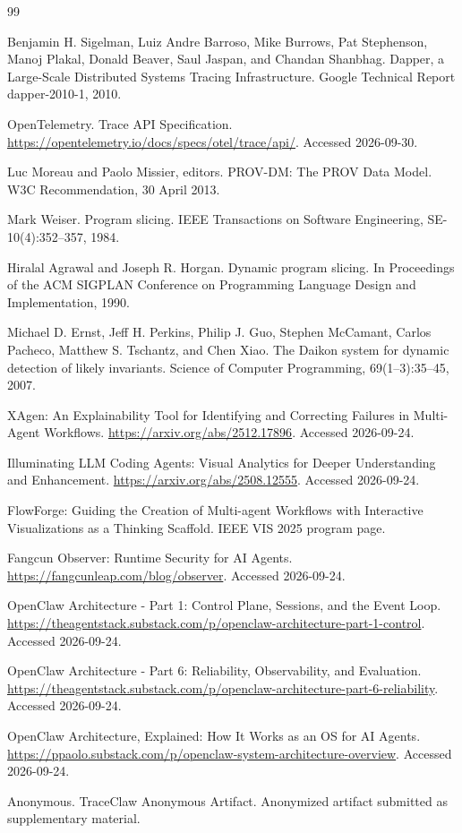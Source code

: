 \documentclass[11pt,a4paper]{article}
\begin{document}
\begin{thebibliography}{99}

Benjamin H. Sigelman, Luiz Andre Barroso, Mike Burrows, Pat Stephenson,
Manoj Plakal, Donald Beaver, Saul Jaspan, and Chandan Shanbhag. Dapper,
a Large-Scale Distributed Systems Tracing Infrastructure. Google
Technical Report dapper-2010-1, 2010.

OpenTelemetry. Trace API Specification.
\url{https://opentelemetry.io/docs/specs/otel/trace/api/}. Accessed 2026-09-30.

Luc Moreau and Paolo Missier, editors. PROV-DM: The PROV Data Model. W3C
Recommendation, 30 April 2013.

Mark Weiser. Program slicing. IEEE Transactions on Software Engineering,
SE-10(4):352--357, 1984.

Hiralal Agrawal and Joseph R. Horgan. Dynamic program slicing. In
Proceedings of the ACM SIGPLAN Conference on Programming Language Design
and Implementation, 1990.

Michael D. Ernst, Jeff H. Perkins, Philip J. Guo, Stephen McCamant,
Carlos Pacheco, Matthew S. Tschantz, and Chen Xiao. The Daikon system for
dynamic detection of likely invariants. Science of Computer Programming,
69(1--3):35--45, 2007.

XAgen: An Explainability Tool for Identifying and Correcting Failures in
Multi-Agent Workflows. \url{https://arxiv.org/abs/2512.17896}. Accessed 2026-09-24.

Illuminating LLM Coding Agents: Visual Analytics for Deeper Understanding
and Enhancement. \url{https://arxiv.org/abs/2508.12555}. Accessed 2026-09-24.

FlowForge: Guiding the Creation of Multi-agent Workflows with Interactive
Visualizations as a Thinking Scaffold. IEEE VIS 2025 program page.

Fangcun Observer: Runtime Security for AI Agents.
\url{https://fangcunleap.com/blog/observer}. Accessed 2026-09-24.

OpenClaw Architecture - Part 1: Control Plane, Sessions, and the Event Loop.
\url{https://theagentstack.substack.com/p/openclaw-architecture-part-1-control}.
Accessed 2026-09-24.

OpenClaw Architecture - Part 6: Reliability, Observability, and Evaluation.
\url{https://theagentstack.substack.com/p/openclaw-architecture-part-6-reliability}.
Accessed 2026-09-24.

OpenClaw Architecture, Explained: How It Works as an OS for AI Agents.
\url{https://ppaolo.substack.com/p/openclaw-system-architecture-overview}.
Accessed 2026-09-24.

Anonymous. TraceClaw Anonymous Artifact. Anonymized artifact submitted as
supplementary material.

\end{thebibliography}
\end{document}
